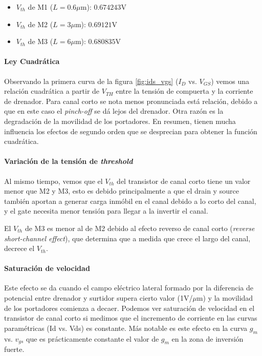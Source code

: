 \begin{itemize}
	\item $V_{th}$ de M1 ($L=0.6\mu$m): $0.674243$V
	\item $V_{th}$ de M2 ($L=3\mu$m): $0.69121$V
	\item $V_{th}$ de M3 ($L=6\mu$m): $0.680835$V
\end{itemize}

\paragraph{Ley Cuadrática}

Observando la primera curva de la figura \ref{fig:ids_vgs} ($I_D$ vs. $V_{GS}$) vemos una relación cuadrática a partir de $V_{TH}$ entre la tensión de compuerta y la corriente de drenador. Para canal corto se nota menos pronunciada está relación, debido a que en este caso el \emph{pinch-off} se dá lejos del drenador. Otra razón es la degradación de la movilidad de los portadores. En resumen, tienen mucha influencia los efectos de segundo orden que se desprecian para obtener la función cuadrática. 

\paragraph{Variación de la tensión de \emph{threshold}}
Al mismo tiempo, vemos que el $V_{th}$ del transistor de canal corto tiene un valor menor que M2 y M3, esto es debido principalmente a que el drain y source también aportan a generar carga inmóbil en el canal debido a lo corto del canal, y el gate necesita menor tensión para llegar a la invertir el canal. 

El $V_{th}$ de M3 es menor al de M2 debido al efecto reverso de canal corto (\emph{reverse short-channel effect}), que determina que a medida que crece el largo del canal, decrece el $V_{th}$.

\paragraph{Saturación de velocidad}
Este efecto se da cuando el campo eléctrico lateral formado por la diferencia de potencial entre drenador y surtidor supera cierto valor (1V/$\mu$m) y la movilidad de los portadores comienza a decaer. Podemos ver saturación de velocidad en el transistor de canal corto si medimos que el incremento de corriente en las curvas paramétricas (Id vs. Vds) es constante. Más notable es este efecto en la curva $g_m$ vs. $v_{gs}$ que es prácticamente constante el valor de $g_m$ en la zona de inversión
fuerte. 






